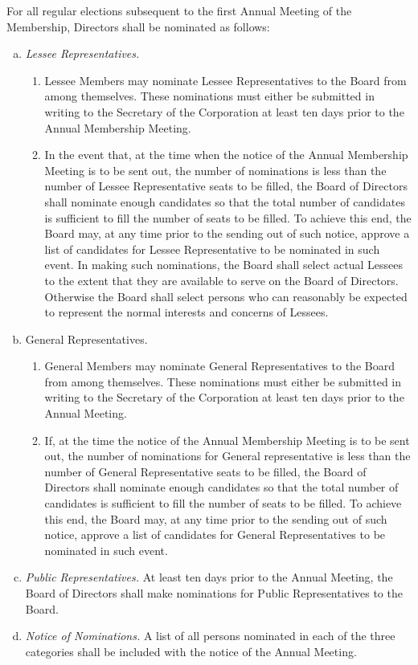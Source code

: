 For all regular elections subsequent to the first Annual Meeting of
the Membership, Directors shall be nominated as follows:
\begin{enumerate}[a.]
\item \emph{Lessee Representatives.}
  \begin{enumerate}[(1)]
  \item Lessee Members may nominate Lessee Representatives to the
    Board from among themselves. These nominations must either be
    submitted in writing to the Secretary of the Corporation at least
    ten days prior to the Annual Membership Meeting.
  \item In the event that, at the time when the notice of the Annual
    Membership Meeting is to be sent out, the number of nominations is
    less than the number of Lessee Representative seats to be filled,
    the Board of Directors shall nominate enough candidates so that
    the total number of candidates is sufficient to fill the number of
    seats to be filled. To achieve this end, the Board may, at any
    time prior to the sending out of such notice, approve a list of
    candidates for Lessee Representative to be nominated in such
    event. In making such nominations, the Board shall select actual
    Lessees to the extent that they are available to serve on the
    Board of Directors. Otherwise the Board shall select persons who
    can reasonably be expected to represent the normal interests and
    concerns of Lessees.
  \end{enumerate}
\item{General Representatives.}
  \begin{enumerate}[(1)]
  \item General Members may nominate General Representatives to the
    Board from among themselves. These nominations must either be
    submitted in writing to the Secretary of the Corporation at least
    ten days prior to the Annual Meeting.
  \item If, at the time the notice of the Annual Membership Meeting is
    to be sent out, the number of nominations for General
    representative is less than the number of General Representative
    seats to be filled, the Board of Directors shall nominate enough
    candidates so that the total number of candidates is sufficient to
    fill the number of seats to be filled. To achieve this end, the
    Board may, at any time prior to the sending out of such notice,
    approve a list of candidates for General Representatives to be
    nominated in such event.
  \end{enumerate}
\item \emph{Public Representatives.}  At least ten days prior to the
  Annual Meeting, the Board of Directors shall make nominations for
  Public Representatives to the Board.
\item \emph{Notice of Nominations.}  A list of all persons nominated
  in each of the three categories shall be included with the notice of
  the Annual Meeting.
\end{enumerate}

